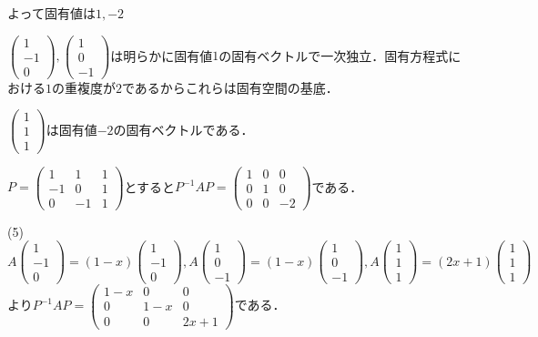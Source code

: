 \documentclass[
		book,
		head_space=20mm,
		foot_space=20mm,
		gutter=10mm,
		line_length=190mm
]{jlreq}
\begin{document}
    よって固有値は$1,-2$

    $\begin{pmatrix}
        1 \\
        -1 \\
        0
    \end{pmatrix},\begin{pmatrix}
        1 \\
        0 \\
        -1
        \end{pmatrix}$は明らかに固有値$1$の固有ベクトルで一次独立．固有方程式における$1$の重複度が$2$であるからこれらは固有空間の基底．

    $\begin{pmatrix}
        1 \\
        1 \\
        1
    \end{pmatrix}$は固有値$-2$の固有ベクトルである．

    $P=\begin{pmatrix}
        1 & 1 & 1 \\
        -1 & 0 & 1 \\
        0 & -1 & 1
    \end{pmatrix}$とすると$P^{-1}AP=\begin{pmatrix}
        1 & 0 & 0 \\
        0 & 1 & 0 \\
        0 & 0 & -2
    \end{pmatrix}$である．

    (5)$A\begin{pmatrix}
        1 \\
        -1 \\
        0
    \end{pmatrix}=(1-x)\begin{pmatrix}
        1 \\
        -1 \\
        0
        \end{pmatrix},A\begin{pmatrix}
        1 \\
        0 \\
        -1
    \end{pmatrix}=(1-x)\begin{pmatrix}
        1 \\
        0 \\
        -1
        \end{pmatrix},A\begin{pmatrix}
        1 \\
        1 \\
        1
        \end{pmatrix}=(2x+1)\begin{pmatrix}
        1 \\
        1 \\
        1
        \end{pmatrix}$より$P^{-1}AP=\begin{pmatrix}
            1-x & 0 & 0 \\
            0 & 1-x & 0 \\
            0 & 0 & 2x+1
        \end{pmatrix}$である．
\end{document}
